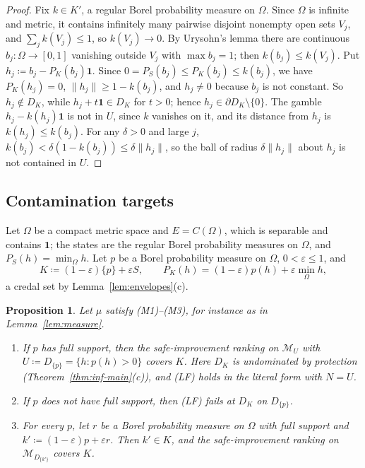 \documentclass[11pt]{article}
\newcommand{\one}{\mathbf{1}}
\newcommand{\M}{\mathcal{M}}
\theoremstyle{plain}
\newtheorem{proposition}[theorem]{Proposition}
\theoremstyle{definition}
\theoremstyle{remark}
\begin{document}
\begin{proof}
Fix $k\in K'$, a regular Borel probability measure on $\Omega$. Since $\Omega$ is infinite
and metric, it contains infinitely many pairwise disjoint nonempty open sets $V_j$, and
$\sum_jk(V_j)\le1$, so $k(V_j)\to0$. By Urysohn's lemma there are continuous $b_j:\Omega
\to[0,1]$ vanishing outside $V_j$ with $\max b_j=1$; then $k(b_j)\le k(V_j)$. Put $h_j
\coloneqq b_j-P_K(b_j)\one$. Since $0=P_S(b_j)\le P_K(b_j)\le k(b_j)$, we have $P_K(h_j)=0$,
$\|h_j\|\ge1-k(b_j)$, and $h_j\ne0$ because $b_j$ is not constant. So $h_j\notin D_K$,
while $h_j+t\one\in D_K$ for $t>0$; hence $h_j\in\partial D_K\setminus\{0\}$. The gamble $h_j-k(h_j)\one$ is not in $U$, since $k$ vanishes on it,
and its distance from $h_j$ is $k(h_j)\le k(b_j)$. For any $\delta>0$ and large $j$,
$k(b_j)<\delta(1-k(b_j))\le\delta\|h_j\|$, so the ball of radius $\delta\|h_j\|$ about
$h_j$ is not contained in $U$.
\end{proof}

\subsection{Contamination targets}

Let $\Omega$ be a compact metric space and $E=C(\Omega)$, which is separable and contains
$\one$; the states are the regular Borel probability measures on $\Omega$, and $P_S(h)=
\min_\Omega h$. Let $p$ be a Borel probability measure on $\Omega$, $0<\varepsilon\le1$,
and
\[
  K\coloneqq(1-\varepsilon)\{p\}+\varepsilon S,\qquad P_K(h)=(1-\varepsilon)p(h)+
  \varepsilon\min_\Omega h ,
\]
a credal set by Lemma~\ref{lem:envelopes}(c).

\begin{proposition}\label{prop:contamination}
Let $\mu$ satisfy (M1)--(M3), for instance as in Lemma~\ref{lem:measure}.
\begin{enumerate}[label=(\alph*)]
  \item If $p$ has full support, then the safe-improvement ranking on $\M_U$ with
  $U\coloneqq D_{\{p\}}=\{h:p(h)>0\}$ covers $K$. Here $D_K$ is undominated by
  protection (Theorem~\ref{thm:inf-main}(c)), and (LF) holds in the literal form with
  $N=U$.
  \item If $p$ does not have full support, then (LF) fails at $D_K$ on $D_{\{p\}}$.
  \item For every $p$, let $r$ be a Borel probability measure on $\Omega$ with full support
  and $k'\coloneqq(1-\varepsilon)p+\varepsilon r$. Then $k'\in K$, and the safe-improvement
  ranking on $\M_{D_{\{k'\}}}$ covers $K$.
\end{enumerate}
\end{proposition}
\end{document}
